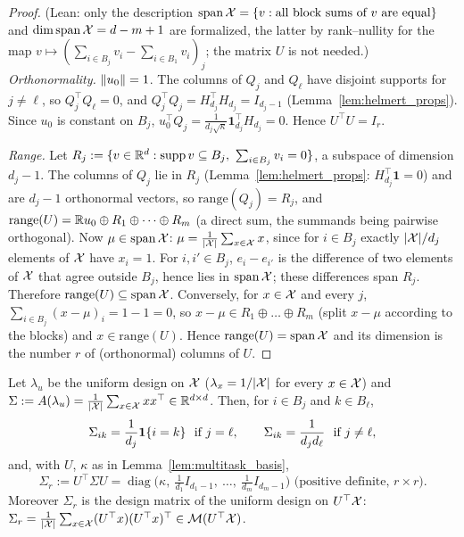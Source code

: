 \begin{proof}
(Lean: only the description $\operatorname{span}\mathcal{X} = \{v : \text{all block sums of } v \text{ are equal}\}$
and $\dim\operatorname{span}\mathcal{X} = d - m + 1$ are formalized, the latter by rank--nullity for the map
$v \mapsto (\sum_{i\in B_j}v_i - \sum_{i\in B_1}v_i)_j$; the matrix $U$ is not needed.)
\emph{Orthonormality.} $\lVert u_0 \rVert = 1$. The columns of $Q_j$ and $Q_\ell$ have disjoint
supports for $j \ne \ell$, so $Q_j^\top Q_\ell = 0$, and $Q_j^\top Q_j = H_{d_j}^\top H_{d_j} = I_{d_j-1}$
(Lemma~\ref{lem:helmert_props}). Since $u_0$ is constant on $B_j$,
$u_0^\top Q_j = \frac{1}{d_j\sqrt\kappa}\mathbf 1_{d_j}^\top H_{d_j} = 0$. Hence $U^\top U = I_r$.

\emph{Range.} Let $R_j := \{v \in \mathbb{R}^d : \operatorname{supp} v \subseteq B_j,\ \sum_{i\in B_j}v_i = 0\}$,
a subspace of dimension $d_j - 1$. The columns of $Q_j$ lie in $R_j$
(Lemma~\ref{lem:helmert_props}: $H_{d_j}^\top\mathbf 1 = 0$) and are $d_j - 1$ orthonormal
vectors, so $\mathrm{range}(Q_j) = R_j$, and
$\mathrm{range}(U) = \mathbb{R} u_0 \oplus R_1\oplus\dots\oplus R_m$ (a direct sum, the summands being
pairwise orthogonal). Now $\mu \in \operatorname{span}\mathcal{X}$: $\mu = \frac{1}{\lvert \mathcal{X} \rvert}\sum_{x\in\mathcal{X}}x$,
since for $i \in B_j$ exactly $\lvert \mathcal{X} \rvert/d_j$ elements of $\mathcal{X}$ have $x_i = 1$. For
$i, i' \in B_j$, $e_i - e_{i'}$ is the difference of two elements of $\mathcal{X}$ that agree
outside $B_j$, hence lies in $\operatorname{span}\mathcal{X}$; these differences span $R_j$. Therefore
$\mathrm{range}(U) \subseteq \operatorname{span}\mathcal{X}$. Conversely, for $x \in \mathcal{X}$ and every $j$,
$\sum_{i\in B_j}(x - \mu)_i = 1 - 1 = 0$, so $x - \mu \in R_1\oplus\dots\oplus R_m$ (split
$x - \mu$ according to the blocks) and $x \in \mathrm{range}(U)$. Hence
$\mathrm{range}(U) = \operatorname{span}\mathcal{X}$ and its dimension is the number $r$ of (orthonormal) columns
of $U$.
\end{proof}

\begin{lemma}\label{lem:multitask_design_cov}
\leanok
{}
Let $\lambda_u$ be the uniform design on $\mathcal{X}$ ($\lambda_x = 1/\lvert \mathcal{X} \rvert$ for every
$x \in \mathcal{X}$) and $\Sigma := A(\lambda_u) = \frac{1}{\lvert \mathcal{X} \rvert}\sum_{x\in\mathcal{X}}xx^\top \in \mathbb{R}^{d\times d}$.
Then, for $i \in B_j$ and $k \in B_\ell$,
\[
  \Sigma_{ik} = \frac{1}{d_j}\mathbf{1}\{i = k\} \ \text{ if } j = \ell, \qquad
  \Sigma_{ik} = \frac{1}{d_jd_\ell} \ \text{ if } j \ne \ell ,
\]
and, with $U$, $\kappa$ as in Lemma~\ref{lem:multitask_basis},
\[
  \Sigma_r := U^\top\Sigma U = \operatorname{diag}\Big(\kappa,\ \tfrac{1}{d_1}I_{d_1-1},\ \dots,\ \tfrac{1}{d_m}I_{d_m-1}\Big)  \text{ (positive definite, } r\times r) .
\]
Moreover $\Sigma_r$ is the design matrix of the uniform design on $U^\top\mathcal{X}$:
$\Sigma_r = \frac{1}{\lvert \mathcal{X} \rvert}\sum_{x\in\mathcal{X}}(U^\top x)(U^\top x)^\top \in \mathcal{M}(U^\top\mathcal{X})$.
\end{lemma}

